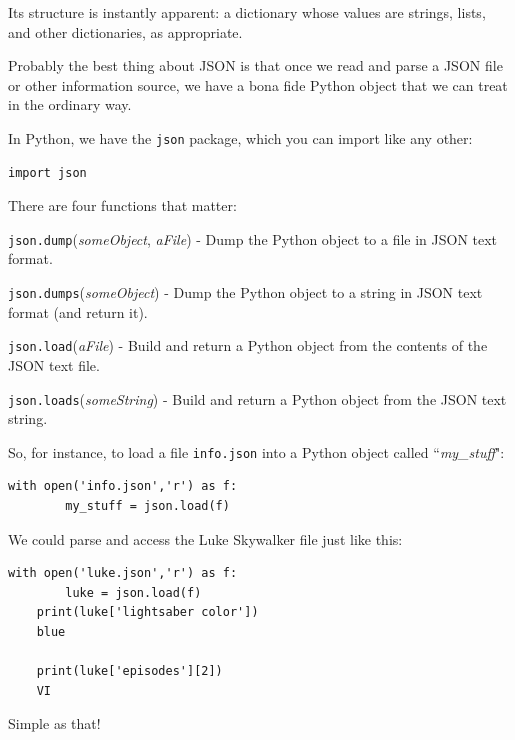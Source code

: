 \documentclass[12pt]{article}
\begin{document}
Its structure is instantly apparent: a dictionary whose values are strings,
lists, and other dictionaries, as appropriate.

Probably the best thing about JSON is that once we read and parse a JSON file
or other information source, we have a bona fide Python object that we can
treat in the ordinary way.

In Python, we have the \texttt{json} package, which you can import like any
other:

\begin{Verbatim}[fontsize=small,samepage=true,frame=none]
    import json
\end{Verbatim}

There are four functions that matter:
\small
\begin{compactitem}
\item \texttt{json.dump}(\textit{someObject}, \textit{aFile}) - Dump the Python
object to a file in JSON text format.
\item \texttt{json.dumps}(\textit{someObject}) - Dump the Python
object to a string in JSON text format (and return it).
\item \texttt{json.load}(\textit{aFile}) - Build and return a Python
object from the contents of the JSON text file.
\item \texttt{json.loads}(\textit{someString}) - Build and return a Python object
from the JSON text string.
\end{compactitem}

\normalsize
So, for instance, to load a file \texttt{info.json} into a Python object
called ``\textit{my\_stuff}":

\small
\begin{Verbatim}[fontsize=small,samepage=true,frame=none]
    with open('info.json','r') as f:
        my_stuff = json.load(f)
\end{Verbatim}

\normalsize
We could parse and access the Luke Skywalker file just like this:

\small
\begin{Verbatim}[fontsize=small,samepage=true,frame=none]
    with open('luke.json','r') as f:
        luke = json.load(f)
    print(luke['lightsaber color'])
    blue

    print(luke['episodes'][2])
    VI
\end{Verbatim}

\normalsize
Simple as that!
\end{document}
